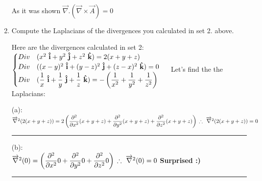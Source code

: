 \documentclass[fleqn]{article}
\begin{document}
\begin{enumerate}
      \textcolor{hwColor}{
        As it was shown $\overrightarrow{\nabla}.(\overrightarrow{\nabla} \times \overrightarrow{A})=0$
      }

    \item Compute the Laplacians of the divergences you calculated in set 2. above.
    
      \textcolor{hwColor}{
        Here are the divergences calculated in set 2: \\
        $
          \begin{cases}
            Div ~ (x^2 \mathbf{\hat{i}}+y^2 \mathbf{\hat{j}}+z^2 \mathbf{\hat{k}})=2(x+y+z) \\
            Div ~ ((x-y)^2 \mathbf{\hat{i}}+(y-z)^2 \mathbf{\hat{j}}+(z-x)^2 \mathbf{\hat{k}})=0 \\
            Div ~ (\dfrac{1}{x} \mathbf{\hat{i}}+\dfrac{1}{y} \mathbf{\hat{j}}+\dfrac{1}{z} \mathbf{\hat{k}})=-\left(\dfrac{1}{x^2}+\dfrac{1}{y^2}+\dfrac{1}{z^2}\right)
          \end{cases} \\ \\
        $
        Let's find the the Laplacians: \\
      }

      \textcolor{hwColor}{
        (a): \\
        $
          \overrightarrow{\nabla}^2(2(x+y+z))=2\left(\dfrac{\partial^2}{\partial x^2}(x+y+z)+\dfrac{\partial^2}{\partial y^2}(x+y+z)+\dfrac{\partial^2}{\partial z^2}(x+y+z)\right) \\
          \\
          \therefore ~ \overrightarrow{\nabla}^2(2(x+y+z))=0
        $
      }

      \rule{15cm}{1pt}

      \textcolor{hwColor}{
        (b): \\
        $
          \overrightarrow{\nabla}^2(0)=\left(\dfrac{\partial^2}{\partial x^2}0+\dfrac{\partial^2}{\partial y^2}0+\dfrac{\partial^2}{\partial z^2}0\right) \\
          \\
          \therefore ~ \overrightarrow{\nabla}^2(0)=0 \\
        $  \textbf{Surprised :)}
      }

      \rule{15cm}{1pt}


\end{enumerate}
\end{document}
